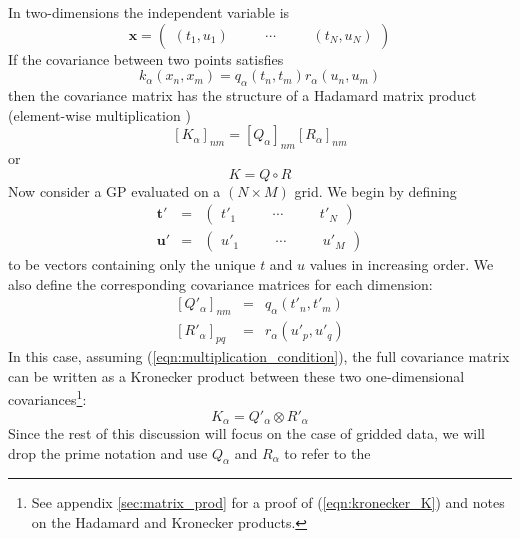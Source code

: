 \documentclass[preprint2]{aastex62}
\newcommand{\bvec}[1]{{\ensuremath{\boldsymbol{#1}}}}
\newcommand{\expandvec}[2]{\left(\begin{array}{ccccc} #1\quad && \cdots\quad && #2 \end{array}\right)}
\begin{document}
	In two-dimensions the independent variable is
	\begin{equation}
		\bvec{x} = \expandvec{(t_1, u_1)}{(t_N, u_N)}
	\end{equation}
	If the covariance between two points satisfies 
	\begin{equation}
	\label{eqn:multiplication_condition}
		k_\alpha(x_n, x_m) = q_\alpha(t_n, t_m)r_\alpha(u_n, u_m)
	\end{equation}
	then the covariance matrix has the structure of a Hadamard matrix product (element-wise 
	multiplication )
	\begin{equation}
		\left[K_\alpha\right]_{nm} = \left[Q_\alpha\right]_{nm}\left[R_\alpha\right]_{nm}
	\end{equation}
	or 
	\begin{equation}
		K = Q\circ R
	\end{equation}
	Now consider a GP evaluated on a $(N\times M)$ grid. We begin by defining
	\begin{eqnarray}
		\bvec{t'} &=& \expandvec{t'_1}{t'_N} \\
		\bvec{u'} &=& \expandvec{u'_1}{u'_M}
	\end{eqnarray}
	to be vectors containing only the unique $t$ and $u$ values in increasing order. 
	We also define the corresponding covariance matrices for each dimension: 
	\begin{subequations}
	\label{eqn:QR_defs}
	\begin{eqnarray}
		\left[Q'_\alpha\right]_{nm} &=& q_\alpha(t'_n, t'_m) \\
		\left[R'_\alpha\right]_{pq} &=& r_\alpha(u'_p, u'_q) 
	\end{eqnarray}
	\end{subequations}
	In this case, assuming (\ref{eqn:multiplication_condition}), the full covariance matrix can be written as a Kronecker product between these 
	two one-dimensional covariances\footnote{See appendix \ref{sec:matrix_prod} for a proof of (\ref{eqn:kronecker_K}) and notes on the Hadamard and Kronecker products. }: 
	\begin{equation}
	\label{eqn:kronecker_K}
		K_\alpha = Q'_\alpha \otimes R'_\alpha
	\end{equation}
	Since the rest of this discussion will focus on the case of gridded data, we will drop the prime notation and use $Q_\alpha$ and $R_\alpha$ to refer to the 
\end{document}
